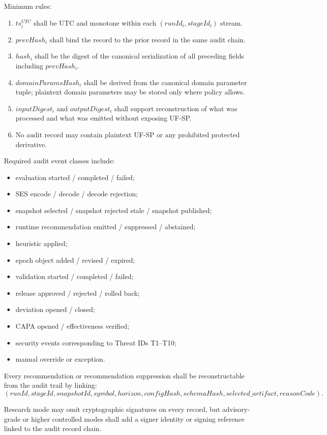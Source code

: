 Minimum rules:
\begin{enumerate}[leftmargin=1.2cm]
\item $ts_i^{UTC}$ shall be UTC and monotone within each $(runId_i,stageId_i)$ stream.
\item $prevHash_i$ shall bind the record to the prior record in the same audit chain.
\item $hash_i$ shall be the digest of the canonical serialization of all preceding fields including $prevHash_i$.
\item $domainParamsHash_i$ shall be derived from the canonical domain parameter tuple; plaintext domain parameters may be stored only where policy allows.
\item $inputDigest_i$ and $outputDigest_i$ shall support reconstruction of what was processed and what was emitted without exposing UF-SP.
\item No audit record may contain plaintext UF-SP or any prohibited protected derivative.
\end{enumerate}

Required audit event classes include:
\begin{itemize}
\item evaluation started / completed / failed;
\item SES encode / decode / decode rejection;
\item snapshot selected / snapshot rejected stale / snapshot published;
\item runtime recommendation emitted / suppressed / abstained;
\item heuristic applied;
\item epoch object added / revised / expired;
\item validation started / completed / failed;
\item release approved / rejected / rolled back;
\item deviation opened / closed;
\item CAPA opened / effectiveness verified;
\item security events corresponding to Threat IDs T1--T10;
\item manual override or exception.
\end{itemize}

Every recommendation or recommendation suppression shall be reconstructable from the audit trail by linking:
\[
(runId,stageId,snapshotId,symbol,horizon,configHash,schemaHash,selected\_artifact,reasonCode).
\]

Research mode may omit cryptographic signatures on every record, but advisory-grade or higher controlled modes shall add a signer identity or signing reference linked to the audit record chain.

